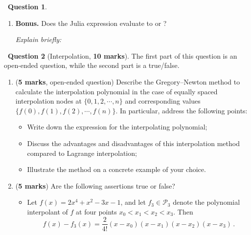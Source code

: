 \documentclass[10pt]{article}
\theoremstyle{definition}
\newtheorem{question}{{\normalfont \faGears}~Question}
\renewcommand{\mymarks}[1]{\textbf{#1 marks}}
\begin{document}
\begin{question}
\begin{enumerate}
            \textit{Explain briefly:}
            \vspace{1cm}

        \item
            \textbf{Bonus.}
            Does the Julia expression  evaluate to  or ?

            \textit{Explain briefly:}
            \vspace{1cm}
    \end{enumerate}
\end{question}

\newpage
\begin{question}
    [Interpolation, \mymarks{10}]
    The first part of this question is an open-ended question,
    while the second part is a true/false.

    \begin{enumerate}
        \item (\mymarks{5}, open-ended question)
            Describe the Gregory--Newton method to calculate the interpolation polynomial in the case of equally spaced interpolation nodes at $\{0, 1, 2, \cdots, n\}$ 
            and corresponding values $\{f(0), f(1), f(2), \cdots, f(n)\}$.
            In particular, address the following points:
            \begin{itemize}
                \item 
                    Write down the expression for the interpolating polynomial;

                \item
                    Discuss the advantages and disadvantages of this interpolation method compared to Lagrange interpolation;

                \item
                    Illustrate the method on a concrete example of your choice.
            \end{itemize}

    \newpage
    \item
        (\mymarks{5}) Are the following assertions true or false?
        \begin{itemize}
            \item 
                Let $f(x) = 2x^4 + x^2 - 3x - 1$,
                and let $f_3 \in \mathcal P_3$ denote the polynomial interpolant of $f$ at four points $x_0 < x_1 < x_2 < x_3$.
                Then
                \[
                    f(x) - f_3(x) = \frac{2}{4!} (x - x_0)(x - x_1)(x - x_2)(x - x_3) \, .
                \]


\end{itemize}
\end{enumerate}
\end{question}
\end{document}
